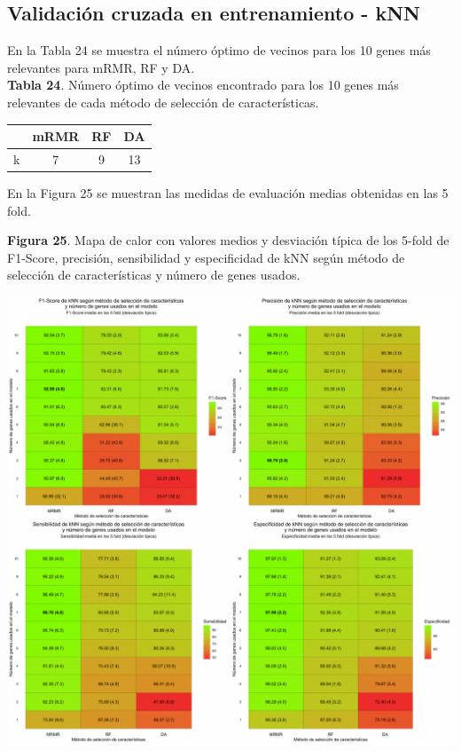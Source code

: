 \subsection{Validación cruzada en entrenamiento - kNN}

En la Tabla 24 se muestra el número óptimo de vecinos para los 10 genes más relevantes para mRMR, RF y DA.\\

\textbf{Tabla 24}. Número óptimo de vecinos encontrado para los 10 genes más relevantes de cada método de selección de características.

\begin{table}[H]
	\centering
	\begin{tabular}{cccc}
		\cline{2-4}
		\textbf{} & \textbf{mRMR} & \textbf{RF} & \textbf{DA} \\ \hline
		k                &    7 &   9     &   13      \\ \hline
	\end{tabular}
\end{table}

En la Figura 25 se muestran las medidas de evaluación medias obtenidas en las 5 fold.\\

\newpage
\begin{center}
\textbf{Figura 25}. Mapa de calor con valores medios y desviación típica de los 5-fold de F1-Score, precisión, sensibilidad y especificidad de kNN según método de selección de características y número de genes usados.
\end{center}
\begin{center}
	\includegraphics[width=1\textwidth]{figuras/25_higado_multiclase_heatmap_knn.pdf} 
\end{center}

